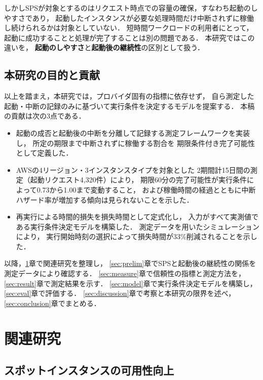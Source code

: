 \documentclass[submit,techrep,noauthor]{ipsj}
\begin{document}
しかしSPSが対象とするのはリクエスト時点での容量の確保，すなわち起動のしやすさであり，
起動したインスタンスが必要な処理時間だけ中断されずに稼働し続けられるかは対象としていない．
短時間ワークロードの利用者にとって，
起動に成功することと処理が完了することは別の問題である．
本研究ではこの違いを，
\textbf{起動のしやすさ}と\textbf{起動後の継続性}の区別として扱う．

\subsection{本研究の目的と貢献}

以上を踏まえ，本研究では，プロバイダ固有の指標に依存せず，
自ら測定した起動・中断の記録のみに基づいて実行条件を決定するモデルを提案する．
本稿の貢献は次の3点である．

\begin{itemize}
\item 起動の成否と起動後の中断を分離して記録する測定フレームワークを実装し，
所定の期限まで中断されずに稼働する割合を
期限条件付き完了可能性として定義した．
\item AWSの4リージョン・3インスタンスタイプを対象とした
2期間計15日間の測定（起動リクエスト4,320件）により，
期限60分の完了可能性が実行条件によって0.73から1.00まで変動すること，
および稼働時間の経過とともに中断ハザード率が増加する傾向は見られないことを示した．
\item 再実行による時間的損失を損失時間として定式化し，
入力がすべて実測値である実行条件決定モデルを構築した．
測定データを用いたシミュレーションにより，
実行開始時刻の選択によって損失時間が33\%削減されることを示した．
\end{itemize}

以降，\ref{sec:related}章で関連研究を整理し，
\ref{sec:prelim}章でSPSと起動後の継続性の関係を測定データにより確認する．
\ref{sec:measure}章で信頼性の指標と測定方法を，
\ref{sec:result}章で測定結果を示す．
\ref{sec:model}章で実行条件決定モデルを構築し，
\ref{sec:eval}章で評価する．
\ref{sec:discussion}章で考察と本研究の限界を述べ，
\ref{sec:conclusion}章でまとめる．


\section{関連研究}
\label{sec:related}

\subsection{スポットインスタンスの可用性向上}
\end{document}
